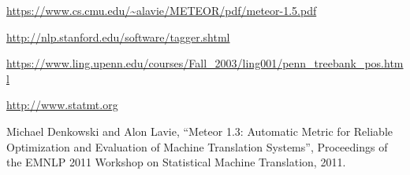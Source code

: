 \documentclass[paper=a4, fontsize=11pt]{scrartcl}
\numberwithin{equation}{section}		%
\numberwithin{figure}{section}			%
\numberwithin{table}{section}				%
\begin{document}
\begin{thebibliography}{6}

 \url{https://www.cs.cmu.edu/~alavie/METEOR/pdf/meteor-1.5.pdf}

 \url{http://nlp.stanford.edu/software/tagger.shtml}

 \url{https://www.ling.upenn.edu/courses/Fall_2003/ling001/penn_treebank_pos.html}

 \url{http://www.statmt.org}

 Michael Denkowski and Alon Lavie, ``Meteor 1.3: Automatic Metric for Reliable Optimization and Evaluation of Machine Translation Systems'', Proceedings of the EMNLP 2011 Workshop on Statistical Machine Translation, 2011.

\end{thebibliography}

\end{document}
